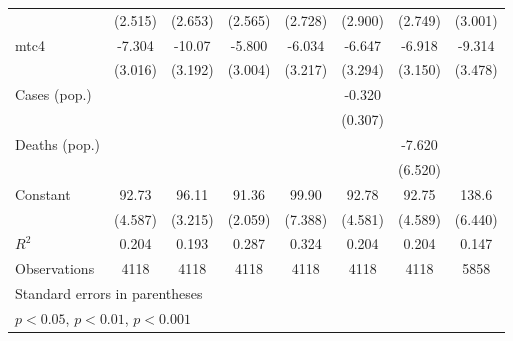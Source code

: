 \documentclass{article}
\begin{document}
{\begin{longtable}{l*{7}{c}}
                &  (2.515)         &  (2.653)         &  (2.565)         &  (2.728)         &  (2.900)         &  (2.749)         &  (3.001)         \\
mtc4            &   -7.304\sym{*}  &   -10.07\sym{**} &   -5.800         &   -6.034         &   -6.647         &   -6.918\sym{*}  &   -9.314\sym{*}  \\
                &  (3.016)         &  (3.192)         &  (3.004)         &  (3.217)         &  (3.294)         &  (3.150)         &  (3.478)         \\
Cases (pop.)    &                  &                  &                  &                  &   -0.320         &                  &                  \\
                &                  &                  &                  &                  &  (0.307)         &                  &                  \\
Deaths (pop.)   &                  &                  &                  &                  &                  &   -7.620         &                  \\
                &                  &                  &                  &                  &                  &  (6.520)         &                  \\
Constant        &    92.73\sym{***}&    96.11\sym{***}&    91.36\sym{***}&    99.90\sym{***}&    92.78\sym{***}&    92.75\sym{***}&    138.6\sym{***}\\
                &  (4.587)         &  (3.215)         &  (2.059)         &  (7.388)         &  (4.581)         &  (4.589)         &  (6.440)         \\
\hline
\(R^{2}\)       &    0.204         &    0.193         &    0.287         &    0.324         &    0.204         &    0.204         &    0.147         \\
Observations    &     4118         &     4118         &     4118         &     4118         &     4118         &     4118         &     5858         \\
\hline\hline
\multicolumn{8}{l}{\footnotesize Standard errors in parentheses}\\
\multicolumn{8}{l}{\footnotesize \sym{*} \(p<0.05\), \sym{**} \(p<0.01\), \sym{***} \(p<0.001\)}\\
\end{longtable}
}
\end{document}
